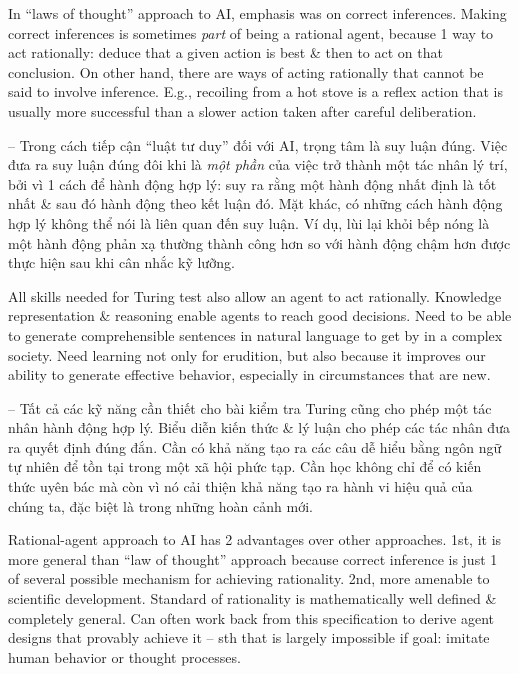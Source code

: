 \documentclass{article}
\begin{document}
\begin{itemize}
\begin{itemize}
\begin{itemize}
\begin{itemize}
				In ``laws of thought'' approach to AI, emphasis was on correct inferences. Making correct inferences is sometimes {\it part}  of being a rational agent, because 1 way to act rationally: deduce that a given action is best \& then to act on that conclusion. On other hand, there are ways of acting rationally that cannot be said to involve inference. E.g., recoiling from a hot stove is a reflex action that is usually more successful than a slower action taken after careful deliberation.
				
				-- Trong cách tiếp cận ``luật tư duy'' đối với AI, trọng tâm là suy luận đúng. Việc đưa ra suy luận đúng đôi khi là {\it một phần} của việc trở thành một tác nhân lý trí, bởi vì 1 cách để hành động hợp lý: suy ra rằng một hành động nhất định là tốt nhất \& sau đó hành động theo kết luận đó. Mặt khác, có những cách hành động hợp lý không thể nói là liên quan đến suy luận. Ví dụ, lùi lại khỏi bếp nóng là một hành động phản xạ thường thành công hơn so với hành động chậm hơn được thực hiện sau khi cân nhắc kỹ lưỡng.
				
				All skills needed for Turing test also allow an agent to act rationally. Knowledge representation \& reasoning enable agents to reach good decisions. Need to be able to generate comprehensible sentences in natural language to get by in a complex society. Need learning not only for erudition, but also because it improves our ability to generate effective behavior, especially in circumstances that are new.
				
				-- Tất cả các kỹ năng cần thiết cho bài kiểm tra Turing cũng cho phép một tác nhân hành động hợp lý. Biểu diễn kiến thức \& lý luận cho phép các tác nhân đưa ra quyết định đúng đắn. Cần có khả năng tạo ra các câu dễ hiểu bằng ngôn ngữ tự nhiên để tồn tại trong một xã hội phức tạp. Cần học không chỉ để có kiến thức uyên bác mà còn vì nó cải thiện khả năng tạo ra hành vi hiệu quả của chúng ta, đặc biệt là trong những hoàn cảnh mới.
				
				Rational-agent approach to AI has 2 advantages over other approaches. 1st, it is more general than ``law of thought'' approach because correct inference is just 1 of several possible mechanism for achieving rationality. 2nd, more amenable to scientific development. Standard of rationality is mathematically well defined \& completely general. Can often work back from this specification to derive agent designs that provably achieve it -- sth that is largely impossible if goal: imitate human behavior or thought processes.
				

\end{itemize}
\end{itemize}
\end{itemize}
\end{itemize}
\end{document}
